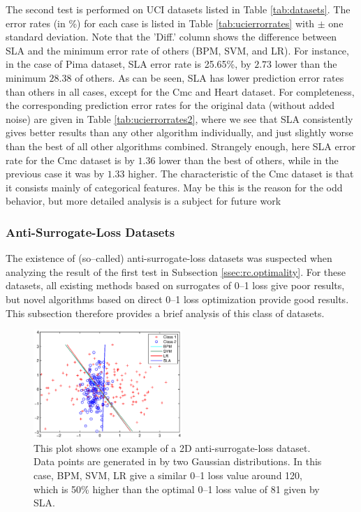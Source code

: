 The second test is performed on UCI datasets listed in Table \ref{tab:datasets}. The error rates (in \%) for each case is listed in Table \ref{tab:ucierrorrates} with $\pm$ one standard deviation. Note that the 'Diff.' column shows the difference between SLA and the minimum error rate of others (BPM, SVM, and LR). For instance, in the case of Pima dataset, SLA error rate is 25.65\%, by $2.73$ lower than the minimum $28.38$ of others. As can be seen,  SLA has lower prediction error rates than others in all cases, except for the Cmc and Heart dataset. For completeness, the corresponding prediction error rates for the original data (without added noise) are given in Table \ref{tab:ucierrorrates2}, where we see that SLA consistently gives better results than any other algorithm individually, and just slightly worse than the best of all other algorithms combined. Strangely enough, here SLA error rate for the Cmc dataset is by $1.36$ lower than the best of others, while in the previous case it was by $1.33$ higher. The characteristic of the Cmc dataset is that it consists mainly of categorical features. May be this is the reason for the odd behavior, but more detailed analysis is a subject for future work 


\subsubsection{Anti-Surrogate-Loss Datasets}
\label{ssec:rc.anti}

The existence of (so--called) anti-surrogate-loss datasets was suspected when analyzing the result of the first test in Subsection \ref{ssec:rc.optimality}. For these datasets, all existing methods based on surrogates of 0--1 loss give poor results, but novel algorithms based on direct 0--1 loss optimization provide good results. This subsection therefore provides a brief analysis of this class of datasets. 

\begin{figure}[here]
\includegraphics[width=0.50\textwidth]{images/fig63_633a.eps}
\caption{
This plot shows one example of a 2D anti-surrogate-loss dataset. Data points are generated in by two Gaussian distributions. In this case, BPM, SVM, LR give a similar 0--1 loss value around 120, which is 50\% higher than the optimal 0--1 loss value of 81 given by SLA.   
}
\label{fig:633a}
\end{figure}


